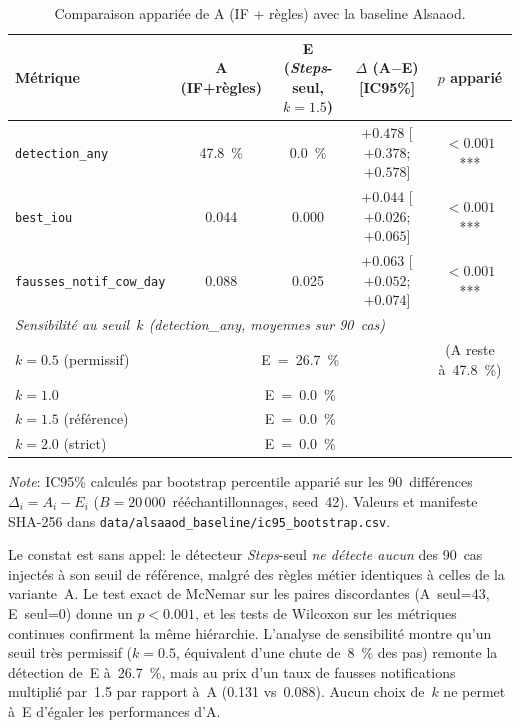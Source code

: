 \begin{table}[H]
    \centering
    \caption{Comparaison appariée de A (IF + règles) avec la baseline Alsaaod.}
    \label{tab:vs_alsaaod}
    \small
    \setlength{\tabcolsep}{4pt}
    \begin{tabular}{lcccc}
        \toprule
        \textbf{Métrique} & \textbf{A (IF+règles)}
            & \textbf{E (\textit{Steps}-seul, $k=1.5$)}
            & \textbf{$\Delta$ (A$-$E) [IC95\%]}
            & \textbf{$p$ apparié} \\
        \midrule
        \texttt{detection\_any}           & 47.8~\% & 0.0~\%
            & $+0.478$ [$+0.378$; $+0.578$] & $<0.001$*** \\
        \texttt{best\_iou}                & 0.044   & 0.000
            & $+0.044$ [$+0.026$; $+0.065$] & $<0.001$*** \\
        \texttt{fausses\_notif\_cow\_day} & 0.088   & 0.025
            & $+0.063$ [$+0.052$; $+0.074$] & $<0.001$*** \\
        \midrule
        \multicolumn{5}{l}{\textit{Sensibilité au seuil~$k$
            (detection\_any, moyennes sur 90~cas)}}                           \\
        $k = 0.5$ (permissif)  & \multicolumn{3}{c}{E~=~26.7~\%}
            & (A reste à~47.8~\%) \\
        $k = 1.0$              & \multicolumn{3}{c}{E~=~0.0~\%}
            &                     \\
        $k = 1.5$ (référence)  & \multicolumn{3}{c}{E~=~0.0~\%}
            &                     \\
        $k = 2.0$ (strict)     & \multicolumn{3}{c}{E~=~0.0~\%}
            &                     \\
        \bottomrule
    \end{tabular}

    \vspace{0.3em}
    \raggedright\footnotesize\textit{Note}: IC95\% calculés par bootstrap
    percentile apparié sur les 90~différences $\Delta_i = A_i - E_i$
    ($B = 20\,000$~rééchantillonnages, seed~42). Valeurs et manifeste
    SHA-256 dans \texttt{data/alsaaod\_baseline/ic95\_bootstrap.csv}.
\end{table}

Le constat est sans appel: le détecteur \textit{Steps}-seul \emph{ne détecte
aucun} des 90~cas injectés à son seuil de référence, malgré des règles
métier identiques à celles de la variante~A. Le test exact de McNemar
sur les paires discordantes (A~seul=43, E~seul=0) donne un
$p < 0.001$, et les tests de Wilcoxon sur les métriques continues
confirment la même hiérarchie. L'analyse de sensibilité montre qu'un
seuil très permissif ($k=0.5$, équivalent d'une chute de~8~\% des pas)
remonte la détection de~E à~26.7~\%, mais au prix d'un taux de fausses
notifications multiplié par~1.5 par rapport à~A (0.131 vs~0.088). Aucun
choix de~$k$ ne permet à~E d'égaler les performances d'A.

